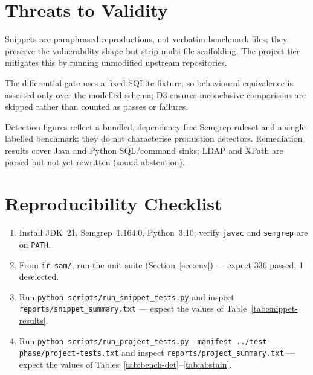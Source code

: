 \documentclass[11pt,a4paper]{article}
\newcommand{\code}[1]{\texttt{\small #1}}
\begin{document}
\section{Threats to Validity}
\begin{description}[leftmargin=1.6em,style=nextline]
  \item[Construct validity.] Snippets are paraphrased reproductions, not
  verbatim benchmark files; they preserve the vulnerability shape but
  strip multi-file scaffolding. The project tier mitigates this by running
  unmodified upstream repositories.
  \item[Internal validity.] The differential gate uses a fixed SQLite
  fixture, so behavioural equivalence is asserted only over the modelled
  schema; D3 ensures inconclusive comparisons are skipped rather than
  counted as passes or failures.
  \item[External validity.] Detection figures reflect a bundled,
  dependency-free Semgrep ruleset and a single labelled benchmark; they do
  not characterise production detectors. Remediation results cover Java
  and Python SQL/command sinks; LDAP and XPath are parsed but not yet
  rewritten (sound abstention).
\end{description}

\section{Reproducibility Checklist}
\begin{enumerate}[leftmargin=1.6em,nosep]
  \item Install JDK~21, Semgrep~1.164.0, Python~3.10; verify
  \code{javac} and \code{semgrep} are on \code{PATH}.
  \item From \code{ir-sam/}, run the unit suite (Section~\ref{sec:env}) ---
  expect 336 passed, 1 deselected.
  \item Run \code{python scripts/run\_snippet\_tests.py} and inspect
  \code{reports/snippet\_summary.txt} --- expect the values of
  Table~\ref{tab:snippet-results}.
  \item Run \code{python scripts/run\_project\_tests.py
  --manifest ../test-phase/project-tests.txt} and inspect
  \code{reports/project\_summary.txt} --- expect the values of
  Tables~\ref{tab:bench-det}--\ref{tab:abstain}.
\end{enumerate}
\end{document}
